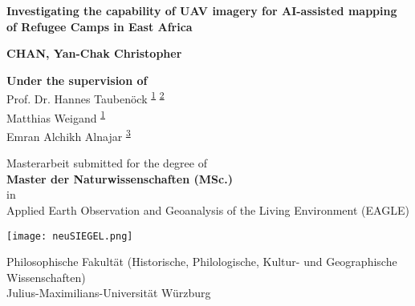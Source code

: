 \documentclass[11pt, a4paper, twoside]{report}
\begin{document}
\begin{titlepage}
   \begin{center}
       \vspace{0.25cm}

       \large
       \textbf{Investigating the capability of UAV imagery for AI-assisted mapping of Refugee Camps in East Africa}

       \vspace{0.75cm}

       \normalsize
       \textbf{CHAN, Yan-Chak Christopher}

       \vspace{2cm}

       \textbf{Under the supervision of} \\
       Prof. Dr. Hannes Taubenöck \textsuperscript{\hyperlink{DLR}{1}} \textsuperscript{\hyperlink{JMWU}{2}} \\
       Matthias Weigand \textsuperscript{\hyperlink{DLR}{1}} \\
       Emran Alchikh Alnajar \textsuperscript{\hyperlink{HOT}{3}}

       \vspace{1cm}

       Masterarbeit submitted for the degree of\\
       \textbf{Master der Naturwissenschaften (MSc.)}\\
       \vspace{0.25cm}
       in\\
       \vspace{0.25cm}
       Applied Earth Observation and Geoanalysis of the Living Environment (EAGLE)

       \vspace{0.5cm}

       \texttt{[image: neuSIEGEL.png]}

       \vspace{0.5cm}

       \normalsize
       Philosophische Fakultät (Historische, Philologische, Kultur- und Geographische Wissenschaften)\\
       Julius-Maximilians-Universität Würzburg\\


   \end{center}
\end{titlepage}
\end{document}
